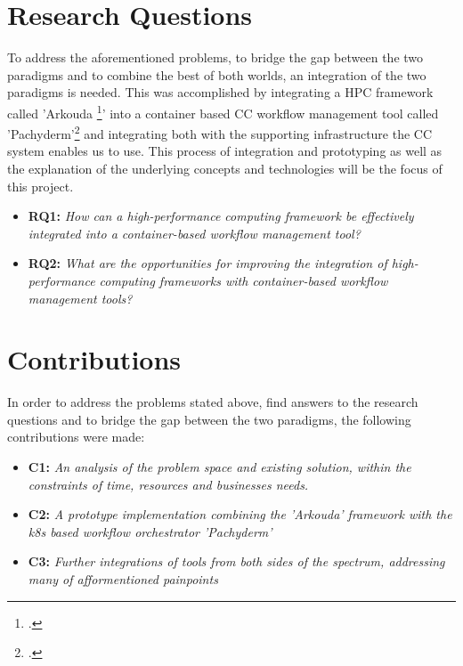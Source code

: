 \section{Research Questions}

To address the aforementioned problems, to bridge the gap between the two paradigms and to combine the best of both worlds, an integration of the two paradigms is needed.
This was accomplished by integrating a \ac{HPC} framework called 'Arkouda \footcite{merrillArkoudaInteractiveData2019}' into a container based \ac{CC} workflow management tool called 'Pachyderm'\footcite{pachydermPachyderm} and integrating both with the supporting infrastructure the \ac{CC} system enables us to use.
This process of integration and prototyping as well as the explanation of the underlying concepts and technologies will be the focus of this project.

\begin{itemize}
    \item \textbf{RQ1:} \textit{
        How can a high-performance computing framework be effectively integrated into a container-based workflow management tool?
    }
    \item \textbf{RQ2:} \textit{
        What are the opportunities for improving the integration of high-performance computing frameworks with container-based workflow management tools?
    }
\end{itemize}

\newpage

\section{Contributions}

In order to address the problems stated above, find answers to the research questions and to bridge the gap between the two paradigms, the following contributions were made:
\begin{itemize}
    \item \textbf{C1:} \textit{ An analysis of the problem space and existing solution, within the constraints of time, resources and businesses needs.}
    \item \textbf{C2:} \textit{ A prototype implementation combining the 'Arkouda' framework with the \ac{k8s} based workflow orchestrator 'Pachyderm'}
    \item \textbf{C3:} \textit{ Further integrations of tools from both sides of the spectrum, addressing many of afformentioned painpoints}
\end{itemize}